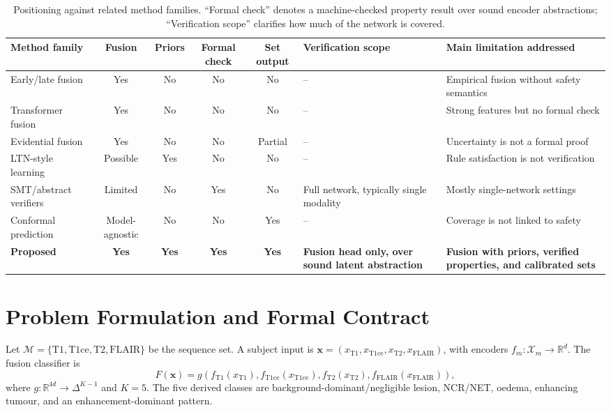 \documentclass[preprint,11pt]{elsarticle}
\newcommand{\R}{\mathbb{R}}
\newcommand{\X}{\mathcal{X}}
\newcommand{\M}{\mathcal{M}}
\begin{document}
\begin{table}[H]
\centering
\caption{Positioning against related method families. ``Formal check'' denotes a machine-checked property result over sound encoder abstractions; ``Verification scope'' clarifies how much of the network is covered.}
\label{tab:related_comparison}
\scriptsize
\begin{adjustbox}{max width=\textwidth}
\begin{tabular}{p{2.6cm}ccccp{2.6cm}p{4.0cm}}
\toprule
\textbf{Method family} & \textbf{Fusion} & \textbf{Priors} & \textbf{Formal check} & \textbf{Set output} & \textbf{Verification scope} & \textbf{Main limitation addressed} \\
\midrule
Early/late fusion \cite{zhou2019review} & Yes & No & No & No & -- & Empirical fusion without safety semantics \\
Transformer fusion \cite{hatamizadeh2022unetr} & Yes & No & No & No & -- & Strong features but no formal check \\
Evidential fusion \cite{sensoy2018evidential} & Yes & No & No & Partial & -- & Uncertainty is not a formal proof \\
LTN-style learning \cite{donadello2017ltn} & Possible & Yes & No & No & -- & Rule satisfaction is not verification \\
SMT/abstract verifiers \cite{katz2019marabou,singh2019abstract} & Limited & No & Yes & No & Full network, typically single modality & Mostly single-network settings \\
Conformal prediction \cite{angelopoulos2021gentle} & Model-agnostic & No & No & Yes & -- & Coverage is not linked to safety \\
\textbf{Proposed} & \textbf{Yes} & \textbf{Yes} & \textbf{Yes} & \textbf{Yes} & \textbf{Fusion head only, over sound latent abstraction} & \textbf{Fusion with priors, verified properties, and calibrated sets} \\
\bottomrule
\end{tabular}
\end{adjustbox}
\end{table}

\section{Problem Formulation and Formal Contract}
\label{sec:problem}

Let $\M=\{\mathrm{T1},\mathrm{T1ce},\mathrm{T2},\mathrm{FLAIR}\}$ be the sequence set. A subject input is $\mathbf{x}=(x_{\mathrm{T1}},x_{\mathrm{T1ce}},x_{\mathrm{T2}},x_{\mathrm{FLAIR}})$, with encoders $f_m:\X_m\rightarrow\R^d$. The fusion classifier is
\begin{equation}
F(\mathbf{x})=g(f_{\mathrm{T1}}(x_{\mathrm{T1}}),f_{\mathrm{T1ce}}(x_{\mathrm{T1ce}}),f_{\mathrm{T2}}(x_{\mathrm{T2}}),f_{\mathrm{FLAIR}}(x_{\mathrm{FLAIR}})),
\end{equation}
where $g:\R^{4d}\rightarrow\Delta^{K-1}$ and $K=5$. The five derived classes are background-dominant/negligible lesion, NCR/NET, oedema, enhancing tumour, and an enhancement-dominant pattern.
\end{document}
